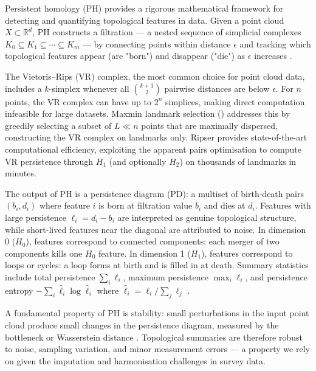 Persistent homology (PH) provides a rigorous mathematical framework for detecting and quantifying topological features in data. Given a point cloud $X \subset \mathbb{R}^d$, PH constructs a filtration --- a nested sequence of simplicial complexes $K_0 \subseteq K_1 \subseteq \cdots \subseteq K_m$ --- by connecting points within distance $\epsilon$ and tracking which topological features appear (are "born") and disappear ("die") as $\epsilon$ increases \citep{edelsbrunner2002topological, zomorodian2005computing}.

The Vietoris--Rips (VR) complex, the most common choice for point cloud data, includes a $k$-simplex whenever all $\binom{k+1}{2}$ pairwise distances are below $\epsilon$. For $n$ points, the VR complex can have up to $2^n$ simplices, making direct computation infeasible for large datasets. Maxmin landmark selection (\citet{desilva2004topological}) addresses this by greedily selecting a subset of $L \ll n$ points that are maximally dispersed, constructing the VR complex on landmarks only. Ripser \citep{bauer2021ripser} provides state-of-the-art computational efficiency, exploiting the apparent pairs optimisation to compute VR persistence through $H_1$ (and optionally $H_2$) on thousands of landmarks in minutes.

The output of PH is a persistence diagram (PD): a multiset of birth-death pairs $(b_i, d_i)$ where feature $i$ is born at filtration value $b_i$ and dies at $d_i$. Features with large persistence $\ell_i = d_i - b_i$ are interpreted as genuine topological structure, while short-lived features near the diagonal are attributed to noise. In dimension 0 ($H_0$), features correspond to connected components: each merger of two components kills one $H_0$ feature. In dimension 1 ($H_1$), features correspond to loops or cycles: a loop forms at birth and is filled in at death. Summary statistics include total persistence $\sum_i \ell_i$, maximum persistence $\max_i \ell_i$, and persistence entropy $-\sum_i \hat{\ell}_i \log \hat{\ell}_i$ where $\hat{\ell}_i = \ell_i / \sum_j \ell_j$ \citep{atienza2019persistent}.

A fundamental property of PH is stability: small perturbations in the input point cloud produce small changes in the persistence diagram, measured by the bottleneck or Wasserstein distance \citep{cohen2007stability}. Topological summaries are therefore robust to noise, sampling variation, and minor measurement errors --- a property we rely on given the imputation and harmonisation challenges in survey data.

